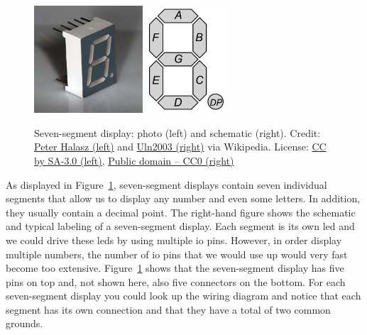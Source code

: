 \begin{figure}[htb]
    \centering
    \includegraphics[height=4cm]{graphics/02_display/7seg_photo.jpg} \hspace{1.5cm}
    \includegraphics[height=4cm]{graphics/02_display/7seg_schematic.png}
    \caption{Seven-segment display: photo (left) and schematic (right). Credit: \href{https://en.wikipedia.org/wiki/Seven-segment_display\#/media/File:Seven_segment_01_Pengo.jpg}{Peter Halasz (left)} and \href{https://en.wikipedia.org/wiki/Seven-segment_display\#/media/File:7_Segment_Display_with_Labeled_Segments.svg}{Uln2003 (right)} via Wikipedia. License: \href{https://creativecommons.org/licenses/by-sa/3.0/}{CC by SA-3.0 (left)}, \href{https://en.wikipedia.org/wiki/Seven-segment_display\#/media/File:7_Segment_Display_with_Labeled_Segments.svg}{Public domain -- CC0 (right)}}
    \label{fig:display:7seg}
\end{figure}
As displayed in Figure~\ref{fig:display:7seg}, seven-segment displays contain seven individual segments that allow us to display any number and even some letters. In addition, they usually contain a decimal point. The right-hand figure shows the schematic and typical labeling of a seven-segment display. Each segment is its own \ac{led} and we could drive these \acp{led} by using multiple \ac{io} pins. However, in order display multiple numbers, the number of \ac{io} pins that we would use up would very fast become too extensive. Figure~\ref{fig:display:7seg} shows that the seven-segment display has five pins on top and, not shown here, also five connectors on the bottom. For each seven-segment display you could look up the wiring diagram and notice that each segment has its own connection and that they have a total of two common grounds.

